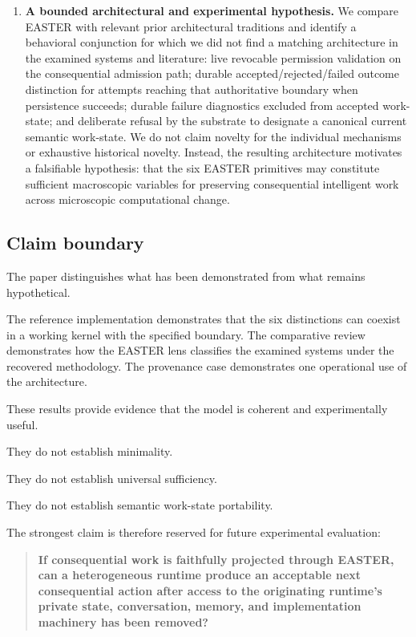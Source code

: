 \documentclass[11pt]{article}
\begin{document}
\begin{enumerate}
\item \textbf{A bounded architectural and experimental hypothesis.}   We compare EASTER with relevant prior architectural traditions and identify a behavioral conjunction for which we did not find a matching architecture in the examined systems and literature: live revocable permission validation on the consequential admission path; durable accepted/rejected/failed outcome distinction for attempts reaching that authoritative boundary when persistence succeeds; durable failure diagnostics excluded from accepted work-state; and deliberate refusal by the substrate to designate a canonical current semantic work-state. We do not claim novelty for the individual mechanisms or exhaustive historical novelty. Instead, the resulting architecture motivates a falsifiable hypothesis: that the six EASTER primitives may constitute sufficient macroscopic variables for preserving consequential intelligent work across microscopic computational change.
\end{enumerate}

\subsection{Claim boundary}

The paper distinguishes what has been demonstrated from what remains hypothetical.

The reference implementation demonstrates that the six distinctions can coexist in a working kernel with the specified boundary. The comparative review demonstrates how the EASTER lens classifies the examined systems under the recovered methodology. The provenance case demonstrates one operational use of the architecture.

These results provide evidence that the model is coherent and experimentally useful.

They do not establish minimality.

They do not establish universal sufficiency.

They do not establish semantic work-state portability.

The strongest claim is therefore reserved for future experimental evaluation:

\begin{quote}
\textbf{If consequential work is faithfully projected through EASTER, can a heterogeneous runtime produce an acceptable next consequential action after access to the originating runtime's private state, conversation, memory, and implementation machinery has been removed?}
\end{quote}
\end{document}
